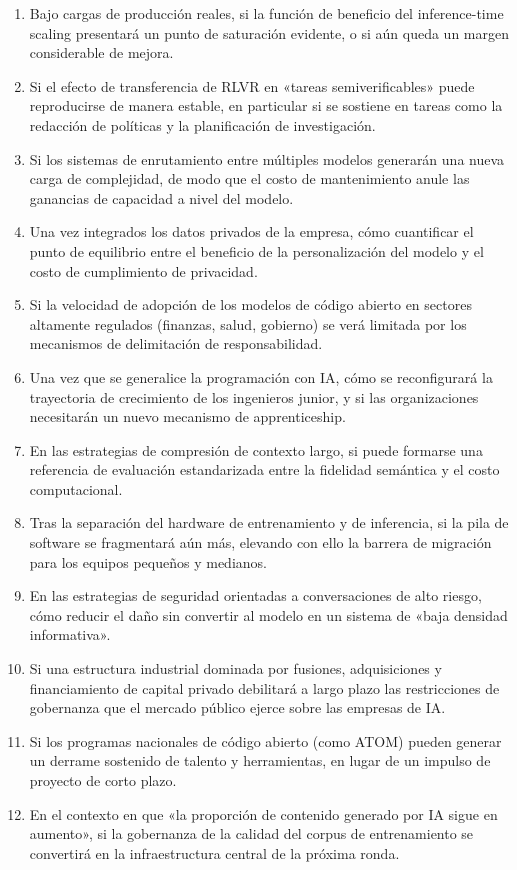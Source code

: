 \begin{enumerate}[leftmargin=1.8em]
    \item Bajo cargas de producción reales, si la función de beneficio del inference-time scaling presentará un punto de saturación evidente, o si aún queda un margen considerable de mejora.
    \item Si el efecto de transferencia de RLVR en «tareas semiverificables» puede reproducirse de manera estable, en particular si se sostiene en tareas como la redacción de políticas y la planificación de investigación.
    \item Si los sistemas de enrutamiento entre múltiples modelos generarán una nueva carga de complejidad, de modo que el costo de mantenimiento anule las ganancias de capacidad a nivel del modelo.
    \item Una vez integrados los datos privados de la empresa, cómo cuantificar el punto de equilibrio entre el beneficio de la personalización del modelo y el costo de cumplimiento de privacidad.
    \item Si la velocidad de adopción de los modelos de código abierto en sectores altamente regulados (finanzas, salud, gobierno) se verá limitada por los mecanismos de delimitación de responsabilidad.
    \item Una vez que se generalice la programación con IA, cómo se reconfigurará la trayectoria de crecimiento de los ingenieros junior, y si las organizaciones necesitarán un nuevo mecanismo de apprenticeship.
    \item En las estrategias de compresión de contexto largo, si puede formarse una referencia de evaluación estandarizada entre la fidelidad semántica y el costo computacional.
    \item Tras la separación del hardware de entrenamiento y de inferencia, si la pila de software se fragmentará aún más, elevando con ello la barrera de migración para los equipos pequeños y medianos.
    \item En las estrategias de seguridad orientadas a conversaciones de alto riesgo, cómo reducir el daño sin convertir al modelo en un sistema de «baja densidad informativa».
    \item Si una estructura industrial dominada por fusiones, adquisiciones y financiamiento de capital privado debilitará a largo plazo las restricciones de gobernanza que el mercado público ejerce sobre las empresas de IA.
    \item Si los programas nacionales de código abierto (como ATOM) pueden generar un derrame sostenido de talento y herramientas, en lugar de un impulso de proyecto de corto plazo.
    \item En el contexto en que «la proporción de contenido generado por IA sigue en aumento», si la gobernanza de la calidad del corpus de entrenamiento se convertirá en la infraestructura central de la próxima ronda.
\end{enumerate}

